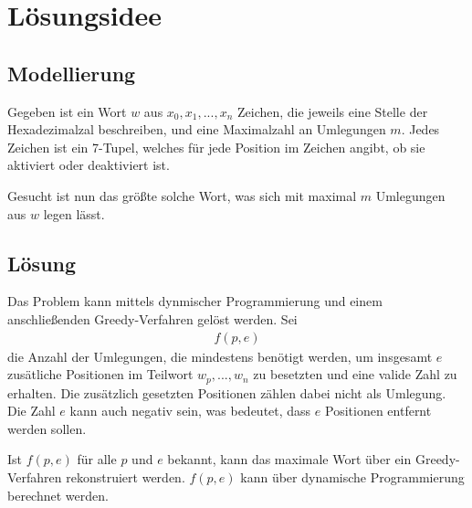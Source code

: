 \documentclass[a4paper,10pt,ngerman]{scrartcl}
\begin{document}
\maketitle
\tableofcontents

\section{Lösungsidee}
\subsection{Modellierung}
Gegeben ist ein Wort $w$ aus $x_0, x_1, ..., x_n$ Zeichen, die jeweils eine Stelle der Hexadezimalzal beschreiben, und eine Maximalzahl an Umlegungen $m$. Jedes Zeichen ist ein 7-Tupel, welches für jede Position im Zeichen angibt, ob sie aktiviert oder deaktiviert ist. 

Gesucht ist nun das größte solche Wort, was sich mit maximal $m$ Umlegungen aus $w$ legen lässt.

\subsection{Lösung}

Das Problem kann mittels dynmischer Programmierung und einem anschließenden Greedy-Verfahren gelöst werden. 
Sei
\begin{align}
    f(p, e)
\end{align}
die Anzahl der Umlegungen, die mindestens benötigt werden, um insgesamt $e$ zusätliche Positionen im Teilwort $w_p, ..., w_n$ zu besetzten und eine valide Zahl zu erhalten. Die zusätzlich gesetzten Positionen zählen dabei nicht als Umlegung. Die Zahl $e$ kann auch negativ sein, was bedeutet, dass $e$ Positionen entfernt werden sollen.

Ist $f(p, e)$ für alle $p$ und $e$ bekannt, kann das maximale Wort über ein Greedy-Verfahren rekonstruiert werden. 
$f(p, e)$ kann über dynamische Programmierung berechnet werden. 
\end{document}
